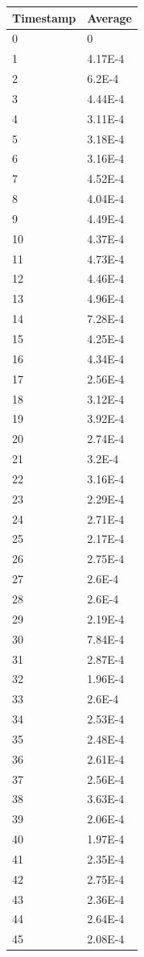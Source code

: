 %
%
\begin{tabular}{|l||l|}
\hline
	\textbf{Timestamp} & \textbf{Average} \\ \hline
	0 & 0 \\ \hline
	1 & 4.17E-4 \\ \hline
	2 & 6.2E-4 \\ \hline
	3 & 4.44E-4 \\ \hline
	4 & 3.11E-4 \\ \hline
	5 & 3.18E-4 \\ \hline
	6 & 3.16E-4 \\ \hline
	7 & 4.52E-4 \\ \hline
	8 & 4.04E-4 \\ \hline
	9 & 4.49E-4 \\ \hline
	10 & 4.37E-4 \\ \hline
	11 & 4.73E-4 \\ \hline
	12 & 4.46E-4 \\ \hline
	13 & 4.96E-4 \\ \hline
	14 & 7.28E-4 \\ \hline
	15 & 4.25E-4 \\ \hline
	16 & 4.34E-4 \\ \hline
	17 & 2.56E-4 \\ \hline
	18 & 3.12E-4 \\ \hline
	19 & 3.92E-4 \\ \hline
	20 & 2.74E-4 \\ \hline
	21 & 3.2E-4 \\ \hline
	22 & 3.16E-4 \\ \hline
	23 & 2.29E-4 \\ \hline
	24 & 2.71E-4 \\ \hline
	25 & 2.17E-4 \\ \hline
	26 & 2.75E-4 \\ \hline
	27 & 2.6E-4 \\ \hline
	28 & 2.6E-4 \\ \hline
	29 & 2.19E-4 \\ \hline
	30 & 7.84E-4 \\ \hline
	31 & 2.87E-4 \\ \hline
	32 & 1.96E-4 \\ \hline
	33 & 2.6E-4 \\ \hline
	34 & 2.53E-4 \\ \hline
	35 & 2.48E-4 \\ \hline
	36 & 2.61E-4 \\ \hline
	37 & 2.56E-4 \\ \hline
	38 & 3.63E-4 \\ \hline
	39 & 2.06E-4 \\ \hline
	40 & 1.97E-4 \\ \hline
	41 & 2.35E-4 \\ \hline
	42 & 2.75E-4 \\ \hline
	43 & 2.36E-4 \\ \hline
	44 & 2.64E-4 \\ \hline
	45 & 2.08E-4 \\ \hline
\end{tabular}
